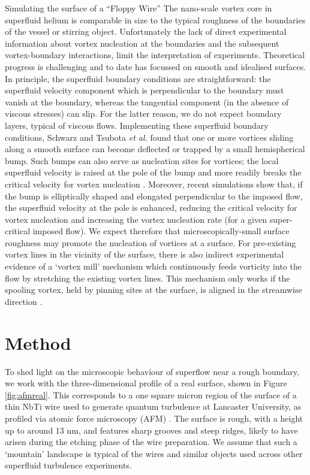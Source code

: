 \begin{chapter}{\label{cha:afm}Simulating the surface of a ``Floppy Wire''}
The nano-scale vortex core in superfluid helium is comparable in size 
to the typical roughness of the boundaries of the vessel or stirring object. 
Unfortunately the lack of direct experimental information about vortex 
nucleation at the boundaries and the subsequent vortex-boundary interactions,
limit the interpretation of experiments. Theoretical
progress is challenging and to date has focussed on smooth and idealised surfaces.  In principle, the superfluid boundary conditions
are straightforward:
the superfluid velocity
component which is perpendicular to the boundary must vanish
at the boundary, whereas the tangential component (in the absence of
viscous stresses) can slip.  For the latter reason, we do not expect boundary layers,
typical of viscous flows.   
Implementing these {superfluid} boundary conditions, 
Schwarz \cite{Schwarz-bump}
and Tsubota {\it et al.} \cite{PhysRevB.50.579}
found that one or more vortices sliding along a smooth surface
can become deflected or trapped by a small
hemispherical bump.  Such bumps can also serve as nucleation sites for vortices;  the local superfluid velocity is raised at the pole of the bump and more readily breaks the critical velocity for vortex nucleation \cite{win01}.  Moreover, recent simulations \cite{stagg_parker_14} show that, if
the bump is elliptically shaped and elongated perpendicular to the imposed flow, the superfluid velocity at the pole
is enhanced, reducing the critical velocity for vortex nucleation and increasing the vortex nucleation rate (for a given super-critical imposed flow). 
We expect therefore that microscopically-small surface roughness may promote the nucleation of vortices at a surface.
For pre-existing vortex lines in the vicinity of the surface, there is also indirect experimental evidence of a `vortex mill' mechanism 
which continuously feeds vorticity into the flow by stretching 
{the existing vortex} lines. This mechanism only works if the spooling vortex, 
held by pinning sites at the surface, is aligned in the streamwise direction \cite{PhysRevLett.64.1130}.

\section{Method\label{section:methodafm}}
To shed light on the microscopic behaviour of superflow near a rough
boundary, we work with the three-dimensional profile of a real surface, shown in Figure \ref{fig:afmreal}.  This corresponds to a one square micron region of the surface of a thin NbTi wire used to generate quantum turbulence at Lancaster University, as profiled via atomic force microscopy (AFM) \cite{Lawson}.  The surface is rough, with a height up to around 13 nm, and features sharp grooves and steep ridges, likely to have arisen during the etching phase of the wire preparation.    We assume that such a `mountain'  landscape is typical of the wires and similar objects used across other superfluid turbulence experiments. 


\end{chapter}

